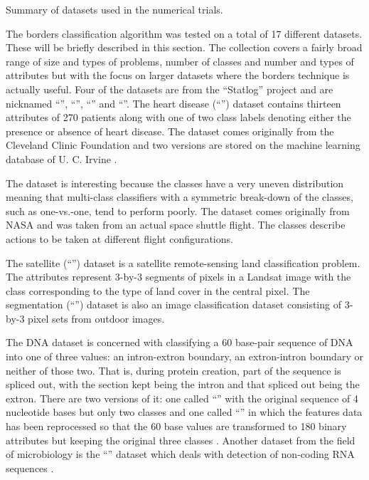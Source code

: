 \begin{table}
	\caption{Summary of datasets used in the numerical trials.}
	\label{summary}
	
\end{table}

The borders classification algorithm was tested on a total of 
17 different datasets.
These will be briefly described in this section.
The collection covers a fairly broad range of size and types of problems, 
number of classes and number and types of attributes but with
the focus on larger datasets where the borders technique is actually useful.
Four of the datasets are from
the ``Statlog'' project \citep{Michie_etal1994,King_etal1995} 
and are nicknamed ``'', ``'', ``'' and ``''.
The heart disease (``'') dataset 
contains thirteen attributes of 270 patients along with one of two class labels denoting either the presence or absence of heart disease.
The dataset comes originally from the Cleveland Clinic Foundation and two versions are stored on the machine learning database of U. C. Irvine \citep{Lichman2013}.

The  dataset is interesting because 
the classes have a very uneven distribution meaning that multi-class
classifiers
with a symmetric break-down of the classes, 
such as one-vs.-one,
tend to perform poorly.
The  dataset comes originally
from NASA and was taken from an actual space shuttle flight.
The classes describe actions to be taken at different flight configurations.

The satellite (``'') dataset is a satellite remote-sensing land classification problem.
The attributes represent 3-by-3 segments of pixels in a Landsat 
image with the class corresponding to the type of land cover in the central pixel.
The segmentation (``'') dataset is also an image classification dataset consisting of 3-by-3
pixel sets from outdoor images.

The DNA dataset is concerned with classifying a 60 base-pair sequence of DNA into
one of three values: an intron-extron boundary, an extron-intron boundary or
neither of those two.
That is, during protein creation, part of the sequence is spliced out, with
the section kept being the intron and that spliced out being the extron.
There are two versions of it: one called ``'' with the original 
sequence of 4 nucleotide bases but only two classes 
and one called ``'' in which
the features data has been reprocessed so that
the 60 base values are transformed to 180 binary attributes but keeping the
original three classes \citep{Michie_etal1994}.
Another dataset from the field of microbiology is the ``'' dataset
which deals with detection of non-coding RNA sequences
\citep{Uzilov_etal2006}.

